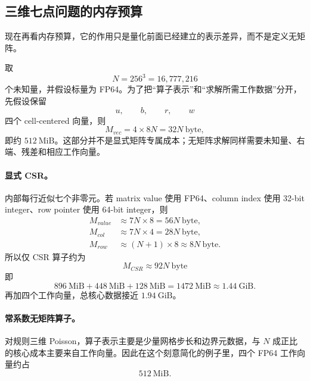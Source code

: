 \subsection{三维七点问题的内存预算}

现在再看内存预算，它的作用只是量化前面已经建立的表示差异，而不是定义无矩阵。

取
\begin{equation}
N=256^3=16{,}777{,}216
\end{equation}
个未知量，并假设标量为 FP64。为了把“算子表示”和“求解所需工作数据”分开，先假设保留
\begin{equation}
u,\qquad b,\qquad r,\qquad w
\end{equation}
四个 cell-centered 向量，则
\begin{equation}
M_{vec}=4\times8N=32N\ \text{byte},
\label{eq:discretization-vector-memory}
\end{equation}
即约 $512\ \mathrm{MiB}$。这部分并不是显式矩阵专属成本；无矩阵求解同样需要未知量、右端、残差和相应工作向量。

\paragraph{显式 CSR。}
内部每行近似七个非零元。若 matrix value 使用 FP64、column index 使用 32-bit integer、row pointer 使用 64-bit integer，则
\begin{align}
M_{value}&\approx7N\times8=56N\ \text{byte},\\
M_{col}&\approx7N\times4=28N\ \text{byte},\\
M_{row}&\approx(N+1)\times8\approx8N\ \text{byte}.
\end{align}
所以仅 CSR 算子约为
\begin{equation}
\boxed{
M_{CSR}\approx92N\ \text{byte}
}
\label{eq:discretization-csr-memory}
\end{equation}
即
\begin{equation}
896\ \mathrm{MiB}
+448\ \mathrm{MiB}
+128\ \mathrm{MiB}
=
1472\ \mathrm{MiB}
\approx1.44\ \mathrm{GiB}.
\end{equation}
再加四个工作向量，总核心数据接近 $1.94\ \mathrm{GiB}$。

\paragraph{常系数无矩阵算子。}
对规则三维 Poisson，算子表示主要是少量网格步长和边界元数据，与 $N$ 成正比的核心成本主要来自工作向量。因此在这个刻意简化的例子里，四个 FP64 工作向量约占
\begin{equation}
512\ \mathrm{MiB}.
\end{equation}

